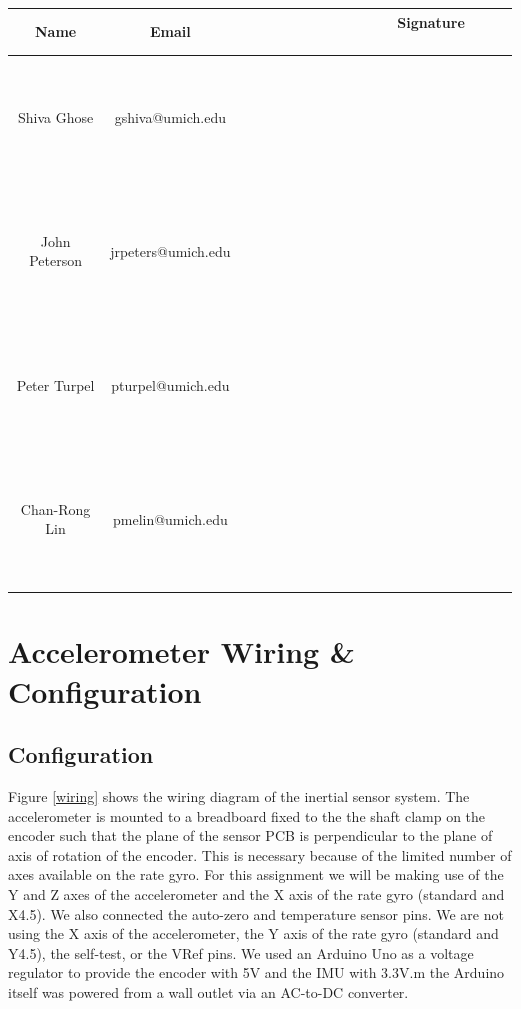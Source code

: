 \documentclass{article}
\theoremstyle{plain}
\theoremstyle{definition}
\theoremstyle{remark}
\begin{document}
\begin{table}[h]
\begin{center}
    \begin{tabular}{|c|c|c|}
        \hline
        \textbf{Name} & \textbf{Email}     & \textbf{ \ \ \ \ \  \ \  \ \ \ \ \  \ \ Signature  \ \ \ \ \  \ \ \ \ \ \ \  \ \ } \\ \hline
        	~& ~& ~\\
	~& ~& ~\\
	Shiva Ghose   & gshiva@umich.edu   & ~                  \\
	~& ~& ~\\
	~& ~& ~\\ \hline 
	~& ~& ~\\
	~& ~& ~\\
        John Peterson & jrpeters@umich.edu & ~                  \\ 
	~& ~& ~\\
	~& ~& ~\\ \hline 
	~& ~& ~\\
	~& ~& ~\\
        Peter Turpel   & pturpel@umich.edu & ~                  \\
	~& ~& ~\\
	~& ~& ~\\ \hline 
	~& ~& ~\\
	~& ~& ~\\
        Chan-Rong Lin   & pmelin@umich.edu & ~                  \\
	~& ~& ~\\
	~& ~& ~\\ \hline 
        \hline
    \end{tabular}
\end{center}
\end{table}

\newpage

\section{Accelerometer Wiring \& Configuration} 

\subsection{Configuration}

Figure \ref{wiring} shows the wiring diagram of the inertial sensor system. The accelerometer is mounted to a breadboard fixed to the the shaft clamp on the encoder such that the plane of the sensor PCB is perpendicular to the plane of axis of rotation of the encoder.  This is necessary because of the limited number of axes available on the rate gyro.  For this assignment we will be making use of the Y and Z axes of the accelerometer and the X axis of the rate gyro (standard and X4.5). We also connected the auto-zero and temperature sensor pins. We are not using the X axis of the accelerometer, the Y axis of the rate gyro (standard and Y4.5), the self-test, or the VRef pins. We used an Arduino Uno as a voltage regulator to provide the encoder with 5V and the IMU with 3.3V.m the Arduino itself was powered from a wall outlet via an AC-to-DC converter.   \\
\end{document}
